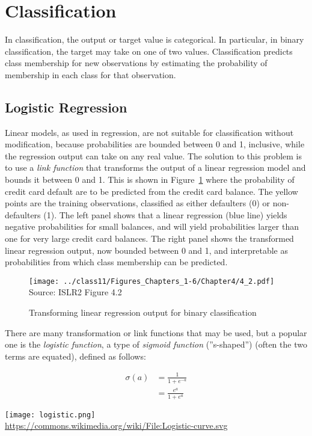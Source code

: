 \section{Classification}

In classification, the output or target value is categorical. In particular, in binary classification, the target may take on one of two values. Classification predicts class membership for new observations by estimating the probability of membership in each class for that observation. 

\subsection{Logistic Regression}

Linear models, as used in regression, are not suitable for classification without modification, because probabilities are bounded between 0 and 1, inclusive, while the regression output can take on any real value. The solution to this problem is to use a \emph{link function} that transforms the output of a linear regression model and bounds it between 0 and 1. This is shown in Figure~\ref{fig:classification1} where the probability of credit card default are to be predicted from the credit card balance. The yellow points are the training observations, classified as either defaulters (0) or non-defaulters (1). The left panel shows that a linear regression (blue line) yields negative probabilities for small balances, and will yield probabilities larger than one for very large credit card balances. The right panel shows the transformed linear regression output, now bounded between 0 and 1, and interpretable as probabilities from which class membership can be predicted.

\begin{figure}
\centering
\texttt{[image: ../class11/Figures\_Chapters\_1-6/Chapter4/4\_2.pdf]}
\scriptsize Source: ISLR2 Figure 4.2

\caption{Transforming linear regression output for binary classification}
\label{fig:classification1}
\end{figure}

There are many transformation or link functions that may be used, but a popular one is the \emph{logistic function}, a type of \emph{sigmoid function} (''s-shaped'') (often the two terms are equated), defined as follows:

\begin{minipage}{.4\textwidth}
\begin{align*}
  \sigma(a) &= \frac{1}{1 + e^{-a}} \\
  &= \frac{e^a}{1 + e^a} %
\end{align*}
\end{minipage}
\begin{minipage}{.6\textwidth}
\centering
\texttt{[image: logistic.png]} \\

\tiny \url{https://commons.wikimedia.org/wiki/File:Logistic-curve.svg} \normalsize
\end{minipage}

